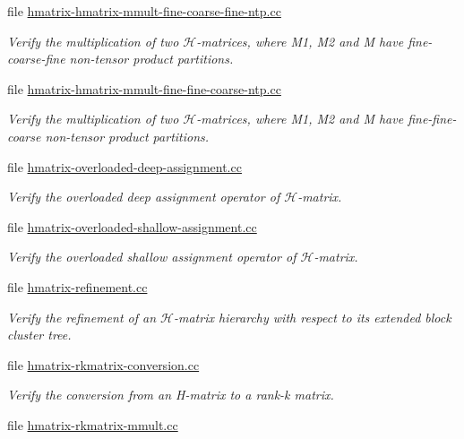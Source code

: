 \begin{DoxyCompactItemize}
file \hyperlink{hmatrix-hmatrix-mmult-fine-coarse-fine-ntp_8cc}{hmatrix-\/hmatrix-\/mmult-\/fine-\/coarse-\/fine-\/ntp.\+cc}
\begin{DoxyCompactList}\small\item\em Verify the multiplication of two $\mathcal{H}$-\/matrices, where M1, M2 and M have fine-\/coarse-\/fine non-\/tensor product partitions. \end{DoxyCompactList}\item 
file \hyperlink{hmatrix-hmatrix-mmult-fine-fine-coarse-ntp_8cc}{hmatrix-\/hmatrix-\/mmult-\/fine-\/fine-\/coarse-\/ntp.\+cc}
\begin{DoxyCompactList}\small\item\em Verify the multiplication of two $\mathcal{H}$-\/matrices, where M1, M2 and M have fine-\/fine-\/coarse non-\/tensor product partitions. \end{DoxyCompactList}\item 
file \hyperlink{hmatrix-overloaded-deep-assignment_8cc}{hmatrix-\/overloaded-\/deep-\/assignment.\+cc}
\begin{DoxyCompactList}\small\item\em Verify the overloaded deep assignment operator of $\mathcal{H}$-\/matrix. \end{DoxyCompactList}\item 
file \hyperlink{hmatrix-overloaded-shallow-assignment_8cc}{hmatrix-\/overloaded-\/shallow-\/assignment.\+cc}
\begin{DoxyCompactList}\small\item\em Verify the overloaded shallow assignment operator of $\mathcal{H}$-\/matrix. \end{DoxyCompactList}\item 
file \hyperlink{hmatrix-refinement_8cc}{hmatrix-\/refinement.\+cc}
\begin{DoxyCompactList}\small\item\em Verify the refinement of an $\mathcal{H}$-\/matrix hierarchy with respect to its extended block cluster tree. \end{DoxyCompactList}\item 
file \hyperlink{hmatrix-rkmatrix-conversion_8cc}{hmatrix-\/rkmatrix-\/conversion.\+cc}
\begin{DoxyCompactList}\small\item\em Verify the conversion from an H-\/matrix to a rank-\/k matrix. \end{DoxyCompactList}\item 
file \hyperlink{hmatrix-rkmatrix-mmult_8cc}{hmatrix-\/rkmatrix-\/mmult.\+cc}

\end{DoxyCompactItemize}
